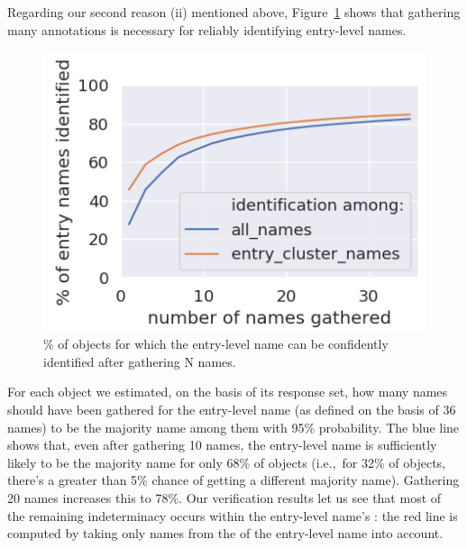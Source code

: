 Regarding our second reason (ii) mentioned above, Figure~\ref{fig:entry-level-name-stability} shows that gathering many annotations is necessary for reliably identifying entry-level names.
\begin{figure}[t]
	\centering
	\includegraphics[width=.7\columnwidth]{images/stability_analytic.png}
	\caption{\% of objects for which the entry-level name can be confidently identified after gathering N names.}
	\label{fig:entry-level-name-stability}
\end{figure}
For each object we estimated, on the basis of its \mn response set, how many names should have been gathered for the entry-level name (as defined on the basis of 36 names) to be the majority name among them with 95\% probability.
The blue line shows that, even after gathering 10 names, the entry-level name is sufficiently likely to be the majority name for only 68\% of objects (i.e.,~for 32\% of objects, there's a greater than 5\% chance of getting a different majority name).
Gathering 20 names increases this to 78\%.
Our verification results let us see that most of the remaining indeterminacy occurs within the entry-level name's \cluster:
the red line is computed by taking only names from the \cluster of the entry-level name into account.

